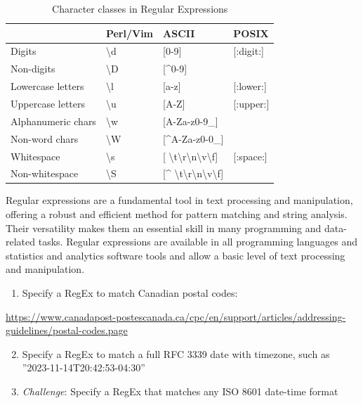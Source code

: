\begin{advanced}
\begin{table}
\small
\centering
\renewcommand{\arraystretch}{1.25}
\begin{tabular}{l|l|l|l} \hline
                  & \textbf{Perl/Vim} & \textbf{ASCII} & \textbf{POSIX} \\ \hline \hline
Digits            & \textbackslash d & [0-9]  & [:digit:]  \\
Non-digits        & \textbackslash D & [\textasciicircum 0-9] & \\
Lowercase letters & \textbackslash l & [a-z] & [:lower:] \\
Uppercase letters & \textbackslash u & [A-Z] & [:upper:] \\
Alphanumeric chars & \textbackslash w & [A-Za-z0-9\_] & \\
Non-word chars    & \textbackslash W & [\textasciicircum A-Za-z0-0\_] & \\
Whitespace        & \textbackslash s & [ \textbackslash t\textbackslash r\textbackslash n\textbackslash v\textbackslash f] & [:space:] \\
Non-whitespace    & \textbackslash S & [\textasciicircum{ } \textbackslash t\textbackslash r\textbackslash n\textbackslash v\textbackslash f] & \\ \hline
\end{tabular}
\caption{Character classes in Regular Expressions}
\label{tab:regexclasses}
\end{table}

Regular expressions are a fundamental tool in text processing and manipulation, offering a robust and efficient method for pattern matching and string analysis. Their versatility makes them an essential skill in many programming and data-related tasks. Regular expressions are available in all programming languages and statistics and analytics software tools and allow a basic level of text processing and manipulation.

\begin{exerciseboxpaper}
\begin{enumerate}
	\item Specify a RegEx to match Canadian postal codes:
\end{enumerate}
\url{https://www.canadapost-postescanada.ca/cpc/en/support/articles/addressing-guidelines/postal-codes.page} 
\begin{enumerate}
	\setcounter{enumi}{1}
	\item Specify a RegEx to match a full RFC 3339 date with timezone, such as ''2023-11-14T20:42:53-04:30''
	\item \emph{Challenge}: Specify a RegEx that matches any ISO 8601 date-time format
\end{enumerate}
\end{exerciseboxpaper}


\end{advanced}
